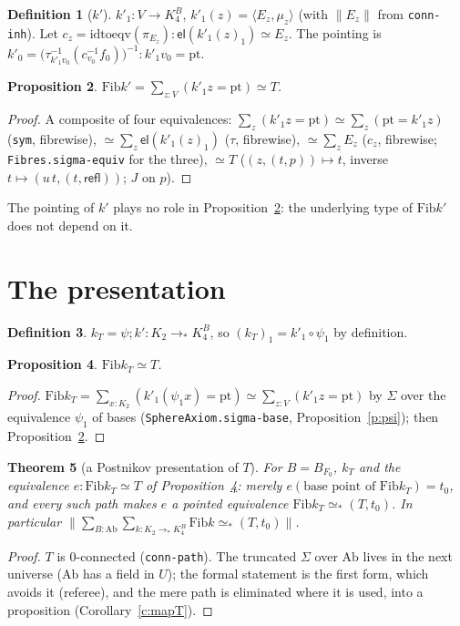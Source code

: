 \documentclass[11pt]{amsart}
\newtheorem{theorem}{Theorem}
\newtheorem{proposition}[theorem]{Proposition}
\theoremstyle{definition}
\newtheorem{definition}[theorem]{Definition}
\theoremstyle{remark}
\newcommand{\code}[1]{\texttt{#1}}
\newcommand{\refl}{\mathsf{refl}}
\newcommand{\el}{\mathsf{el}}
\newcommand{\Fib}{\mathrm{Fib}}
\newcommand{\tr}[1]{\|#1\|}
\begin{document}
\begin{definition}[$k'$]\label{d:kp}
$k'_1:V\to K^B_4$, $k'_1(z)=\langle E_z,\mu_z\rangle$ (with $\tr{E_z}$ from
\code{conn-inh}). Let $c_z=\mathrm{idtoeqv}(\pi_{E_z}):\el(k'_1(z)_1)\simeq E_z$.
The pointing is $k'_0=\bigl(\tau^{-1}_{k'_1 v_0}(c_{v_0}^{-1}f_0)\bigr)^{-1}:k'_1v_0=\mathrm{pt}$.
\end{definition}

\begin{proposition}\label{p:tot}
$\Fib k'=\sum_{z:V}(k'_1z=\mathrm{pt})\simeq T$.
\end{proposition}
\begin{proof}
A composite of four equivalences:
$\sum_z(k'_1z=\mathrm{pt})\simeq\sum_z(\mathrm{pt}=k'_1z)$ (\code{sym}, fibrewise),
$\simeq\sum_z\el(k'_1(z)_1)$ ($\tau$, fibrewise),
$\simeq\sum_zE_z$ ($c_z$, fibrewise; \code{Fibres.sigma-equiv} for the three),
$\simeq T$ ($(z,(t,p))\mapsto t$, inverse $t\mapsto(u\,t,(t,\refl))$; $J$ on $p$).
\end{proof}

The pointing of $k'$ plays no role in Proposition~\ref{p:tot}: the
underlying type of $\Fib k'$ does not depend on it.

\section{The presentation}\label{s:pres}

\begin{definition}
$k_T=\psi;k':K_2\to_*K^B_4$, so $(k_T)_1=k'_1\circ\psi_1$ by definition.
\end{definition}

\begin{proposition}\label{p:fibkT}
$\Fib k_T\simeq T$.
\end{proposition}
\begin{proof}
$\Fib k_T=\sum_{x:K_2}(k'_1(\psi_1x)=\mathrm{pt})\simeq\sum_{z:V}(k'_1z=\mathrm{pt})$
by $\Sigma$ over the equivalence $\psi_1$ of bases
(\code{SphereAxiom.sigma-base}, Proposition~\ref{p:psi}); then
Proposition~\ref{p:tot}.
\end{proof}

\begin{theorem}[a Postnikov presentation of $T$]\label{t:pres}
For $B=B_{F_0}$, $k_T$ and the equivalence $e:\Fib k_T\simeq T$ of
Proposition~\ref{p:fibkT}: merely $e(\text{base point of }\Fib k_T)=t_0$, and
every such path makes $e$ a pointed equivalence $\Fib k_T\simeq_*(T,t_0)$.
In particular
$\tr{\sum_{B:\mathrm{Ab}}\sum_{k:K_2\to_*K^B_4}\Fib k\simeq_*(T,t_0)}$.
\end{theorem}
\begin{proof}
$T$ is 0-connected (\code{conn-path}). The truncated $\Sigma$ over
$\mathrm{Ab}$ lives in the next universe ($\mathrm{Ab}$ has a field in $U$);
the formal statement is the first form, which avoids it (referee), and the
mere path is eliminated where it is used, into a proposition
(Corollary~\ref{c:mapT}).
\end{proof}
\end{document}
